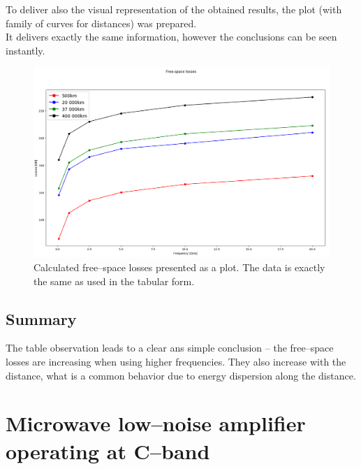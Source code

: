 \documentclass[eng,printmode]{mgr}
\begin{document}
To deliver also the visual representation of the obtained results, the plot (with family of curves for distances) was prepared.\\
It delivers exactly the same information, however the conclusions can be seen instantly.
\begin{figure}[h]
\centering
\includegraphics[width=1\linewidth]{freespaceloss}
\caption{Calculated free--space losses presented as a plot. The data is exactly the same as used in the tabular form.}
\label{fig:freespaceloss}
\end{figure}

\noindent
\section{Summary}
The table observation leads to a clear ans simple conclusion -- the free--space losses are increasing when using higher frequencies. They also increase with the distance, what is a common behavior due to energy dispersion along the distance.
\newpage
\chapter{Microwave low--noise amplifier operating at C--band}
\end{document}
